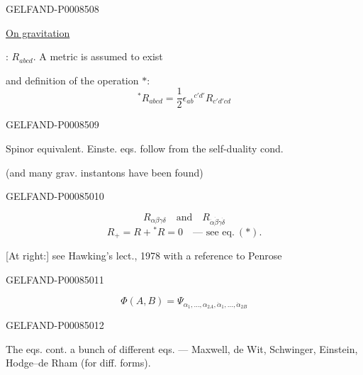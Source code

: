 \begin{GelfandAdjacentEvidence}{GELFAND-P000850}{8}


\uline{On gravitation}

: \(R_{abcd}\). A metric is assumed to exist

and definition of the operation \(*\):
\[
{}^*R_{abcd}=\frac12\epsilon_{ab}{}^{c'd'}R_{c'd'cd} \tag{13}
\]
\end{GelfandAdjacentEvidence}
\begin{GelfandAdjacentEvidence}{GELFAND-P000850}{9}


Spinor equivalent. Einste. eqs. follow from the self-duality cond.

(and many grav. instantons have been found)
\end{GelfandAdjacentEvidence}
\begin{GelfandAdjacentEvidence}{GELFAND-P000850}{10}

\[
R_{\alpha\beta\gamma\delta}\quad\text{and}\quad R_{\dot\alpha\dot\beta\dot\gamma\dot\delta}
\]
\[
R_+=R+{}^*R=0\quad\text{— see eq.}\ (*).
\]

[At right:] see Hawking’s lect., 1978 with a reference to Penrose
\end{GelfandAdjacentEvidence}
\begin{GelfandAdjacentEvidence}{GELFAND-P000850}{11}


\[
\Phi(A,B)=\Psi_{\alpha_1,\ldots,\alpha_{2A},\dot\alpha_1,\ldots,\dot\alpha_{2B}} \tag{14}
\]
\end{GelfandAdjacentEvidence}
\begin{GelfandAdjacentEvidence}{GELFAND-P000850}{12}


The eqs. cont. a bunch of different eqs. — Maxwell, de Wit, Schwinger, Einstein, Hodge–de Rham (for diff. forms).
\end{GelfandAdjacentEvidence}


